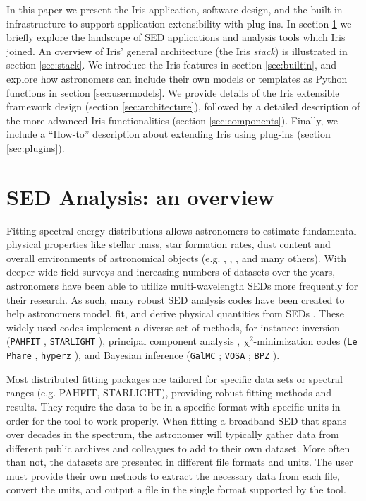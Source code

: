 \documentclass[5p]{elsarticle}
\begin{document}
In this paper we present the Iris application, software design, and the built-in infrastructure to support application extensibility with plug-ins. In section \ref{sec:overview} we briefly explore the landscape of SED applications and analysis tools which Iris joined. An overview of Iris' general architecture (the Iris \emph{stack}) is illustrated in section \ref{sec:stack}. We introduce the Iris features in section \ref{sec:builtin}, and explore how astronomers can include their own models or templates as Python functions in section \ref{sec:usermodels}. We provide details of the Iris extensible framework design (section \ref{sec:architecture}), followed by a detailed description of the more advanced Iris functionalities (section \ref{sec:components}). Finally, we include a ``How-to'' description about extending Iris using plug-ins (section \ref{sec:plugins}).

\section{SED Analysis: an overview}
\label{sec:overview}

Fitting spectral energy distributions allows astronomers to estimate fundamental physical properties like stellar mass, star formation rates, dust content and overall environments of astronomical objects (e.g. \citep{1998AJ....115.1329S}, \citep{2001ApJS..137..139S}, \citep{2007ApJS..169..328R}, and many others). With deeper wide-field surveys and increasing numbers of datasets over the years, astronomers have been able to utilize multi-wavelength SEDs more frequently for their research. As such, many robust SED analysis codes have been created to help astronomers model, fit, and derive physical quantities from SEDs \citep{2011Ap&SS.331....1W,2013ARA&A..51..393C}. These widely-used codes implement a diverse set of methods, for instance: inversion (\texttt{PAHFIT} \citep{2007ApJ...656..770S}, \texttt{STARLIGHT} \cite{2004MNRAS.355..273C}), principal component analysis \citep{2009MNRAS.394.1496B}, $\mathrm{\chi}^{2}$-minimization codes (\texttt{Le Phare} \citep{1999MNRAS.310..540A}, \texttt{hyperz} \citep{2000A&A...363..476B}), and Bayesian inference (\texttt{GalMC} \citep{2011ApJ...737...47A}; \texttt{VOSA} \citep{2008A&A...492..277B}; \texttt{BPZ} \citep{2000ApJ...536..571B}).

Most distributed fitting packages are tailored for specific data sets or spectral ranges (e.g. PAHFIT, STARLIGHT), providing robust fitting methods and results. They require the data to be in a specific format with specific units in order for the tool to work properly. When fitting a broadband SED that spans over decades in the spectrum, the astronomer will typically gather data from different public archives and colleagues to add to their own dataset. More often than not, the datasets are presented in different file formats and units. The user must provide their own methods to extract the necessary data from each file, convert the units, and output a file in the single format supported by the tool. 
\end{document}

